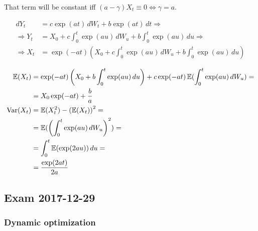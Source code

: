 \documentclass[12pt, a4paper]{article}
\begin{document}
\begin{enumerate}
That term will be constant iff $(a-\gamma) X_t \equiv 0 \Leftrightarrow \gamma = a$.

\begin{align*}
dY_t &= c \exp(at) \,dW_t + b \exp(at) \,dt \Rightarrow\\
\Rightarrow Y_t &= X_0 + c \int_0^{t} \exp(au) \,dW_u + b \int_0^{t} \exp(au) \,du \Rightarrow\\
\Rightarrow X_t &= \exp(-at) \left(X_0 + c \int_0^{t} \exp(au) \,dW_u + b \int_0^{t} \exp(au) \,du\right)
\end{align*}


\begin{align*}
	\operatorname{\mathbb{E}}(X_t) &= \exp(-at) \left(X_0 + b \int_0^{t} \exp(au) \,du\right) + c \exp(-at) \operatorname{\mathbb{E}}(\int_0^{t} \exp(au) \,dW_u) =\\
&= X_0 \exp(-at) + \frac{b}{a}\\
	\operatorname{Var}(X_t) &= \operatorname{\mathbb{E}}(X_t^2) - \left(\operatorname{\mathbb{E}}(X_t)\right)^2 =\\
		 &= \operatorname{\mathbb{E}}(\left(\int_0^{t} \exp(au) \,dW_u\right)^2) =\\
   &= \int_0^{t} \operatorname{\mathbb{E}}(\exp(2au)) \,du =\\
&= \frac{\exp(2at)}{2a}
\end{align*}


\end{enumerate}


\subsection{Exam 2017-12-29}

\subsubsection{Dynamic optimization}
\end{document}
